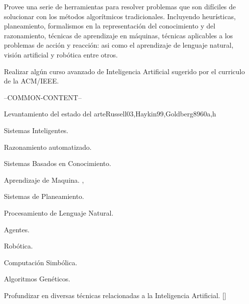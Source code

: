 \begin{syllabus}


\begin{justification}
Provee una serie de herramientas para resolver problemas que son difíciles de solucionar con los métodos algorítmicos tradicionales. Incluyendo heurísticas, planeamiento, formalismos en la representación del conocimiento y del razonamiento, técnicas de aprendizaje en máquinas, técnicas aplicables a los problemas de acción y reacción: asi como el aprendizaje de lenguaje natural, visión artificial y robótica entre otros. 
\end{justification}

\begin{goals}
\item Realizar algún curso avanzado de Inteligencia Artificial sugerido por el curriculo de la ACM/IEEE.
\end{goals}

--COMMON-CONTENT--

\begin{unit}{}{Levantamiento del estado del arte}{Russell03,Haykin99,Goldberg89}{60}{a,h}
\begin{topics}
  \item Sistemas Inteligentes.
  \item Razonamiento automatizado.
  \item Sistemas Basados en Conocimiento.
  \item Aprendizaje de Maquina. \cite{Russell03},\cite{Haykin99}
  \item Sistemas de Planeamiento.
  \item Procesamiento de Lenguaje Natural.
  \item Agentes.
  \item Robótica.
  \item Computación Simbólica.
  \item Algoritmos Genéticos. \cite{Goldberg89}
\end{topics}
\begin{learningoutcomes}
  \item Profundizar en diversas técnicas relacionadas a la Inteligencia Artificial. [\Usage]
\end{learningoutcomes}
\end{unit}

\begin{coursebibliography}
\end{coursebibliography}

\end{syllabus}
